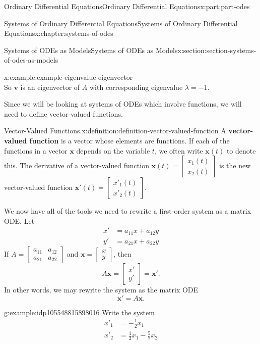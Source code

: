 \documentclass[twoside,10pt,]{book}
\newcommand{\terminology}[1]{\textbf{#1}}
\numberwithin{equation}{part}
\renewcommand{\vec}[1]{\mathbf{#1}}
\newcommand{\amp}{&}
\begin{document}
\begin{partptx}{Ordinary Differential Equations}{}{Ordinary Differential Equations}{}{}{x:part:part-odes}
\begin{chapterptx}{Systems of Ordinary Differential Equations}{}{Systems of Ordinary Differential Equations}{}{}{x:chapter:systems-of-odes}
\begin{sectionptx}{Systems of ODEs as Models}{}{Systems of ODEs as Models}{}{}{x:section:section-systems-of-odes-as-models}
\begin{example}{}{x:example:example-eigenvalue-eigenvector}
\begin{equation*}
\end{equation*}
So \(\vec{v}\) is an eigenvector of \(A\) with corresponding eigenvalue \(\lambda=-1\).%
\end{example}
Since we will be looking at systems of ODEs which involve functions, we will need to define vector-valued functions.%
\begin{definition}{Vector-Valued Functions.}{x:definition:definition-vector-valued-function}%
A \terminology{vector-valued function} is a vector whose elements are functions. If each of the functions in a vector \(\vec{x}\) depends on the variable \(t\), we often write \(\vec{x}(t)\) to denote this. The derivative of a vector-valued function \(\vec{x}(t) = \begin{bmatrix}x_{1}(t)\\x_{2}(t)\end{bmatrix}\) is the new vector-valued function \(\vec{x}'(t)=\begin{bmatrix}x'_{1}(t)\\x'_{2}(t)\end{bmatrix}\).%
\end{definition}
We now have all of the tools we need to rewrite a first-order system as a matrix ODE. Let%
\begin{align*}
x' \amp= a_{11}x+a_{12}y\\
y' \amp= a_{21}x+a_{22}y
\end{align*}
If \(A = \begin{bmatrix}a_{11}\amp a_{12} \\ a_{21}\amp a_{22}\end{bmatrix}\) and \(\vec{x} = \begin{bmatrix}x\\y\end{bmatrix}\), then%
\begin{equation*}
A\vec{x} = \begin{bmatrix}x'\\y'\end{bmatrix} = \vec{x}'.
\end{equation*}
In other words, we may rewrite the system as the matrix ODE%
\begin{equation*}
\vec{x}' =A\vec{x}.
\end{equation*}
%
\begin{example}{}{g:example:idp105548815898016}%
Write the system%
\begin{align*}
x'_{1}  \amp = -\frac{1}{2}x_{1}\\
x'_{2}  \amp = \frac{1}{2}x_{1}-\frac{5}{7}x_{2}

\end{align*}
\end{example}
\end{sectionptx}
\end{chapterptx}
\end{partptx}
\end{document}
